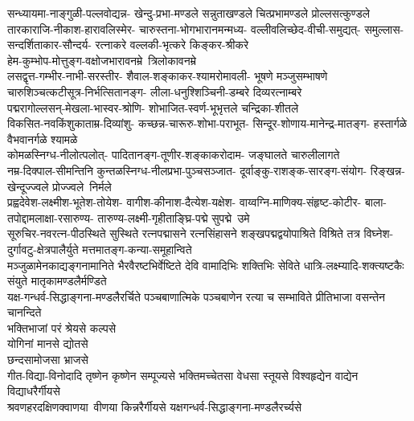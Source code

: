 \begin{multicols}{2}
\begin{flushleft}
सन्ध्यायमा-नाङ्गुळी-पल्लवोद्यन्न-
खेन्दु-प्रभा-मण्डले सन्नुताखण्डले
चित्प्रभामण्डले प्रोल्लसत्कुण्डले\\
\medskip
तारकाराजि-नीकाश-हारावलिस्मेर-
चारुस्तना-भोगभारानमन्मध्य-
वल्लीवलिच्छेद-वीची-समुद्यत्-
समुल्लास-सन्दर्शिताकार-सौन्दर्य-
रत्नाकरे वल्लकी-भृत्करे किङ्कर-श्रीकरे\\
\medskip
हेम-कुम्भोप-मोत्तुङ्ग-वक्षोजभारावनम्रे~त्रिलोकावनम्रे\\
\medskip
लसद्वृत्त-गम्भीर-नाभी-सरस्तीर-
शैवाल-शङ्काकर-श्यामरोमावली-
भूषणे मञ्जुसम्भाषणे\\
\medskip
चारुशिञ्चत्कटीसूत्र-निर्भत्सितानङ्ग-
लीला-धनुश्शिञ्चिनी-डम्बरे दिव्यरत्नाम्बरे\\
\medskip
पद्मरागोल्लसन्-मेखला-भास्वर-श्रोणि-
शोभाजित-स्वर्ण-भूभृत्तले चन्द्रिका-शीतले\\
\medskip
विकसित-नवकिंशुकाताम्र-दिव्यांशु-
कच्छन्न-चारूरु-शोभा-पराभूत-
सिन्दूर-शोणाय-मानेन्द्र-मातङ्ग-
हस्तार्गळे वैभवानर्गळे श्यामळे\\
\medskip
कोमळस्निग्ध-नीलोत्पलोत्-
पादितानङ्ग-तूणीर-शङ्काकरोदाम-
जङ्घालते चारुलीलागते\\
\medskip
नम्र-दिक्पाल-सीमन्तिनि
कुन्तळस्निग्ध-नीलप्रभा-पुञ्चसञ्जात-
दूर्वाङ्कु-राशङ्क-सारङ्ग-संयोग-
रिङ्खन्न-खेन्दूज्ज्वले प्रोज्ज्वले~निर्मले\\
\medskip
प्रह्वदेवेश-लक्ष्मीश-भूतेश-तोयेश-
वागीश-कीनाश-दैत्येश-यक्षेश-
वाय्वग्नि-माणिक्य-संहृष्ट-कोटीर-
बाला-तपोद्दामलाक्षा-रसारुण्य-
तारुण्य-लक्ष्मी-गृहीताङ्घ्रि-पद्मे
सुपद्मे~उमे\\
\medskip
सूरुचिर-नवरत्न-पीठस्थिते सुस्थिते
रत्नपद्मासने रत्नसिंहासने 
शङ्खपद्मद्वयोपाश्रिते विश्रिते
तत्र विघ्नेश-दुर्गावटु-क्षेत्रपालैर्युते
मत्तमातङ्ग-कन्या-समूहान्विते\\
\medskip
मञ्जुळामेनकाद्यङ्गनामानिते
भैरवैरष्टभिर्वेष्टिते देवि 
वामादिभिः शक्तिभिः सेविते 
धात्रि-लक्ष्म्यादि-शक्त्यष्टकैः संयुते
मातृकामण्डलैर्मण्डिते\\
\medskip
यक्ष-गन्धर्व-सिद्धाङ्गना-मण्डलैरर्चिते
पञ्चबाणात्मिके पञ्चबाणेन रत्या च सम्भाविते
प्रीतिभाजा वसन्तेन चानन्दिते\\
\medskip
भक्तिभाजां परं श्रेयसे कल्पसे\\
योगिनां मानसे द्योतसे\\
छन्दसामोजसा भ्राजसे\\
गीत-विद्या-विनोदादि तृष्णेन कृष्णेन सम्पूज्यसे
भक्तिमच्चेतसा वेधसा स्तूयसे
विश्वहृद्येन वाद्येन विद्याधरैर्गीयसे\\
\medskip
श्रवणहरदक्षिणक्वाणया~वीणया 
किन्नरैर्गीयसे यक्षगन्धर्व-सिद्धाङ्गना-मण्डलैरर्च्यसे\\

\end{flushleft}
\end{multicols}
